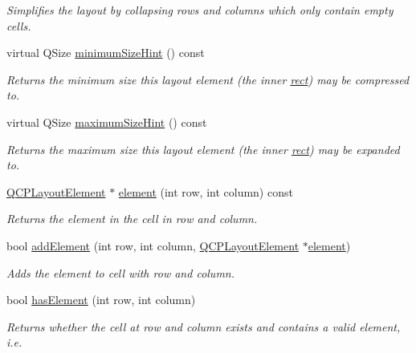 \begin{DoxyCompactItemize}
\begin{DoxyCompactList}\small\item\em Simplifies the layout by collapsing rows and columns which only contain empty cells. \end{DoxyCompactList}\item 
virtual Q\+Size \hyperlink{classQCPLayoutGrid_a67aae235fb4dd9a479aafe07462ef9ee}{minimum\+Size\+Hint} () const 
\begin{DoxyCompactList}\small\item\em Returns the minimum size this layout element (the inner \hyperlink{classQCPLayoutElement_affdfea003469aac3d0fac5f4e06171bc}{rect}) may be compressed to. \end{DoxyCompactList}\item 
virtual Q\+Size \hyperlink{classQCPLayoutGrid_a1ec4bf5914900a51829a7919f74aa58c}{maximum\+Size\+Hint} () const 
\begin{DoxyCompactList}\small\item\em Returns the maximum size this layout element (the inner \hyperlink{classQCPLayoutElement_affdfea003469aac3d0fac5f4e06171bc}{rect}) may be expanded to. \end{DoxyCompactList}\item 
\hyperlink{classQCPLayoutElement}{Q\+C\+P\+Layout\+Element} $\ast$ \hyperlink{classQCPLayoutGrid_a525f25e6ba43ee228151d074251b4e6a}{element} (int row, int column) const 
\begin{DoxyCompactList}\small\item\em Returns the element in the cell in {\itshape row} and {\itshape column}. \end{DoxyCompactList}\item 
bool \hyperlink{classQCPLayoutGrid_adff1a2ca691ed83d2d24a4cd1fe17012}{add\+Element} (int row, int column, \hyperlink{classQCPLayoutElement}{Q\+C\+P\+Layout\+Element} $\ast$\hyperlink{classQCPLayoutGrid_a525f25e6ba43ee228151d074251b4e6a}{element})
\begin{DoxyCompactList}\small\item\em Adds the {\itshape element} to cell with {\itshape row} and {\itshape column}. \end{DoxyCompactList}\item 
bool \hyperlink{classQCPLayoutGrid_ab0cf4f7edc9414a3bfaddac0f46dc0a0}{has\+Element} (int row, int column)
\begin{DoxyCompactList}\small\item\em Returns whether the cell at {\itshape row} and {\itshape column} exists and contains a valid element, i.\+e. \end{DoxyCompactList}\item 

\end{DoxyCompactItemize}
